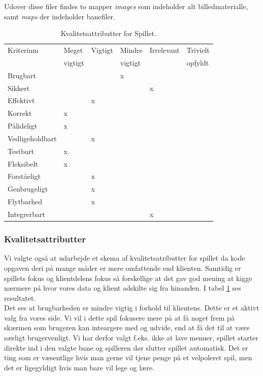 \documentclass[10pt,a4paper,danish]{article}
\begin{document}
Udover disse filer findes to mapper \textit{images} som indeholder alt billedmaterialle, samt \textit{maps} der indeholder banefiler.


\begin{table}[h!]
  \begin{center}
    \begin{tabular}{llllll}
      \toprule
      Kriterium & Meget   & Vigtigt & Mindre  & Irrelevant & Trivielt \\
                & vigtigt &         & vigtigt &            & opfyldt  \\
      \midrule
      Brugbart        & & &x& & \\
      Sikkert         & & & &x& \\
      Effektivt       & &x& & & \\
      Korrekt         &x& & & & \\
      Pålideligt      &x& & & & \\
      Vedligeholdbart & &x& & & \\
      Testbart        &x& & & & \\
      Fleksibelt      &x& & & & \\
      Forståeligt     & &x& & & \\
      Genbrugeligt    & &x& & & \\
      Flytbarhed      & &x& & & \\
      Integrerbart    & & & &x& \\
      \bottomrule
    \end{tabular}
    \caption{Kvalitetsattributter for Spillet.}
    \label{tab:kvalitetsattributter_spil}
  \end{center}
\end{table}

\subsubsection{Kvalitetsattributter}
Vi valgte også at udarbejde et skema af kvalitetsatributter for spillet da kode opgaven deri på mange måder er mere omfattende end klienten. Samtidig er spillets fokus og klientdelens fokus så forskellige at det gav god mening at kigge nærmere på hvor vores data og klient adskilte sig fra hinanden. I tabel \ref{tab:kvalitetsattributter_spil} ses resultatet.
\\

Det ses at brugbarheden er mindre vigtig i forhold til klientens. Dette er et aktivt valg fra vores side. Vi vil i dette spil fokusere mere på at få noget frem på skærmen som brugeren kan inteargere med og udvide, end at få det til at være særligt brugervenligt. Vi har derfor valgt f.eks. ikke at lave menuer, spillet starter direkte ind i den valgte bane og spilleren dør slutter spillet automatisk.
Det er ting som er væsentlige hvis man gerne vil tjene penge på et velpoleret spil, men det er ligegyldigt hvis man bare vil lege og lære.
\\
\end{document}

